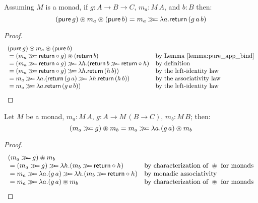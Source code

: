 \begin{lemma}\label{lemma:pure_app_pure_bind}
Assuming $M$ is a monad, 
if $g:A\rightarrow B\rightarrow C$, $m_a:M\,A$, and $b:B$ then:
$$
(\mathsf{pure}\,g) \circledast m_a \circledast (\mathsf{pure}\,b) = m_a \mathbin{\gg\!\!=} \lambda a. \mathsf{return}\,(g\,a\,b)
$$
\end{lemma}
\begin{proof}
$$
\begin{array}{ll}
(\apure\,g) \appl m_a \appl (\apure\,b)\\
{}= (m_a \bind \return\comp g) \appl (\return\,b)
  & \mbox{by Lemma \ref{lemma:pure_app_bind}}\\
{}= (m_a \bind \return\comp g) \bind \lambda h. (\return\,b \bind \return \comp h)
  & \mbox{by definition}\\
{}= (m_a \bind \return\comp g) \bind \lambda h. \return\,(h\,b))
  & \mbox{by the left-identity law}\\
{}= m_a \bind \lambda a. (\return\,(g\,a) \bind \lambda h. \return\,(h\,b))
  & \mbox{by the associativity law}\\
{}= m_a \bind \lambda a. \return\,(g\,a\,b))
  & \mbox{by the left-identity law}
\end{array}
$$
\end{proof}


\begin{lemma}\label{lemma:bind_appl}
Let $M$ be a monad, $m_a:M\,A$, $g:A \rightarrow M\,(B\rightarrow C)$, $m_b:M\,B$; then:
$$
(m_a \mathbin{\gg\!\!=} g) \circledast m_b = m_a \mathbin{\gg\!\!=} \lambda a. (g\,a) \circledast m_b
$$
\end{lemma}
\begin{proof}
$$
\begin{array}{ll}
(m_a \bind g) \appl m_b \\
{}= (m_a \bind g) \bind \lambda h. (m_b \bind \return \comp h)
  & \mbox{by characterization of }\appl\mbox{ for monads}\\
{}= m_a \bind \lambda a. (g\,a) \bind \lambda h. (m_b \bind \return \comp h)
  & \mbox{by monadic associativity}\\
{}= m_a \bind \lambda a. (g\,a) \appl m_b
  & \mbox{by characterization of }\appl\mbox{ for monads}\\  
\end{array}
$$
\end{proof}

